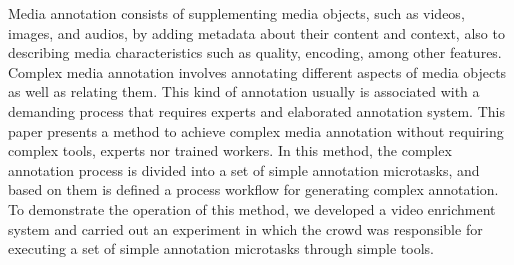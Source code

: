 Media annotation consists of supplementing media objects, such as videos, images, and audios, by adding metadata about their content and context, also to describing media characteristics such as quality, encoding, among other features. Complex media annotation involves annotating different aspects of media objects as well as relating them. This kind of annotation usually is associated with a demanding process that requires experts and elaborated annotation system. This paper presents a method to achieve complex media annotation without requiring complex tools, experts nor trained workers. In this method, the complex annotation process is divided into a set of simple annotation microtasks, and based on them is defined a process workflow for generating complex annotation. To demonstrate the operation of this method, we developed a video enrichment system and carried out an experiment in which the crowd was responsible for executing a set of simple annotation microtasks through simple tools. 



